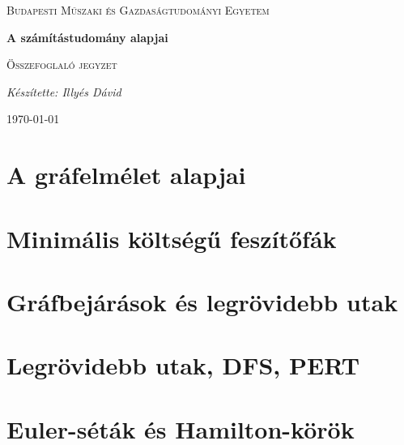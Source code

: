 \documentclass[12pt]{article}
\begin{document}
\begin{titlepage}
	\centering \vfill
	{\textsc{Budapesti Műszaki és Gazdaságtudományi Egyetem} \par} \vspace{7cm}
	{\huge\bfseries A számítástudomány alapjai\par} \vspace{0.5cm}
	{\large \textsc{Összefoglaló jegyzet}\par} \vspace{1.5cm}
	{\Large\itshape Készítette: Illyés Dávid\par} \vfill

	\noindent{}

	\vfill {\large \today\par}
\end{titlepage}
\tableofcontents
{}

	\section{A gráfelmélet alapjai}

		

	\section{Minimális költségű feszítőfák}

		

	\section{Gráfbejárások és legrövidebb utak}

		

	\section{Legrövidebb utak, DFS, PERT}

		

	\section{Euler-séták és Hamilton-körök}
\end{document}
